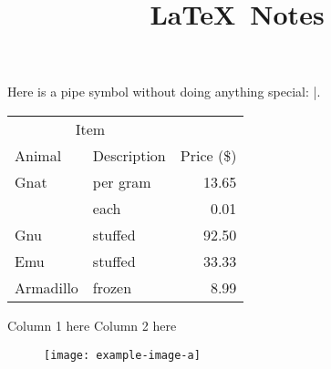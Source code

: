 \documentclass{article}
\title{\LaTeX~Notes}
\author{}
\date{}
\begin{document}
\doublespacing

\maketitle

\tableofcontents

\linenumbers

Here is a pipe symbol without doing anything special: |.

\begin{tabular}{llr}
  \toprule
  \multicolumn{2}{c}{Item} \\
  \cmidrule(r){1-2} %
    Animal    & Description & Price (\$) \\
    \midrule
    Gnat      & per gram    & 13.65      \\
              & each        & 0.01       \\
    Gnu       & stuffed     & 92.50      \\
    Emu       & stuffed     & 33.33      \\
    Armadillo & frozen      & 8.99       \\
  \bottomrule
\end{tabular}






\begin{multicols}{2}
  Column 1 here
  \columnbreak
  Column 2 here
\end{multicols}

\begin{figure}
  \texttt{[image: example-image-a]}
\end{figure}
\end{document}
